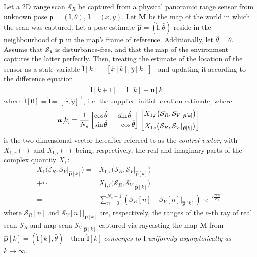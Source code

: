 \begin{theorem}
  \label{prop:theorem_without_disturbance}
  Let a 2D range scan $\mathcal{S}_R$ be captured from a physical panoramic
  range sensor from unknown pose $\bm{p} = (\bm{l},\theta)$, $\bm{l} = (x,y)$.
  Let $\bm{M}$ be the map of the world in which the scan was captured. Let a
  pose estimate $\hat{\bm{p}} = (\hat{\bm{l}}, \hat{\theta})$ reside in the
  neighbourhood of $\bm{p}$ in the map's frame of reference. Additionally, let
  $\hat{\theta} = \theta$. Assume that $\mathcal{S}_R$ is disturbance-free,
  and that the map of the environment captures the latter perfectly. Then,
  treating the estimate of the location of the sensor as a state variable
  $\hat{\bm{l}}[k] = [\hat{x}[k], \hat{y}[k]]^\top$ and updating it according
  to the difference equation
  \begin{align}
    \hat{\bm{l}}[k+1] = \hat{\bm{l}}[k] + \bm{u}[k]
    \label{eq:difference_equation_without_disturbance}
  \end{align}
  where $\hat{\bm{l}}[0] = \hat{\bm{l}} = [\hat{x}, \hat{y}]^{\top}$,
  i.e. the supplied initial location estimate, where
  \begin{align}
    \bm{u}[k] = \dfrac{1}{N_s}
    \begin{bmatrix}
      \cos\hat{\theta} & \sin\hat{\theta} \\
      \sin\hat{\theta} & - \cos\hat{\theta}
    \end{bmatrix}
    \begin{bmatrix}
      X_{1,r}\big(\mathcal{S}_R, \mathcal{S}_V|_{\bm{\hat{p}}[k]}\big) \vspace{0.2cm} \\
      X_{1,i}\big(\mathcal{S}_R, \mathcal{S}_V|_{\bm{\hat{p}}[k]}\big)
    \end{bmatrix}
    \label{eq:control_vector_without_disturbance}
  \end{align}
  is the two-dimensional vector hereafter referred to as the
  \textit{control vector}, with
  $X_{1,r}(\cdot)$ and $X_{1,i}(\cdot)$ being, respectively, the real and
  imaginary parts of the complex quantity $X_1$:
  \begin{align}
    X_1\big(\mathcal{S}_R, \mathcal{S}_V|_{\bm{\hat{p}}[k]}\big) =
      &X_{1,r}\big(\mathcal{S}_R, \mathcal{S}_V|_{\bm{\hat{p}}[k]}\big) \nonumber \\
      + i \cdot &X_{1,i}\big(\mathcal{S}_R, \mathcal{S}_V|_{\bm{\hat{p}}[k]}\big) \nonumber \\
      = &\sum\limits_{n=0}^{N_s-1}(\mathcal{S}_R[n] - \mathcal{S}_V[n]|_{\bm{\hat{p}}[k]}) \cdot e^{-i \frac{2 \pi n}{N_s}} \label{eq:X1}
  \end{align}
  where $\mathcal{S}_R[n]$ and $\mathcal{S}_V[n]|_{\bm{\hat{p}}[k]}$ are,
  respectively, the ranges of the $n$-th ray of real scan $\mathcal{S}_R$ and
  map-scan $\mathcal{S}_V|_{\bm{\hat{p}}[k]}$ captured via raycasting the map
  $\bm{M}$ from $\bm{\hat{p}}[k] = (\hat{\bm{l}}[k], \hat{\theta})$---then
  $\hat{\bm{l}}[k]$ \textit{converges to} $\bm{l}$ \textit{uniformly
  asymptotically as} $k \rightarrow \infty$.
\end{theorem}


